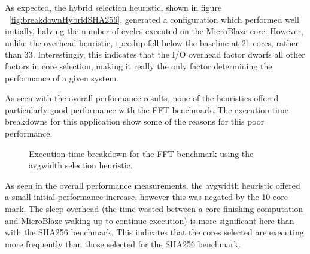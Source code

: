 \documentclass{UoYCSproject}
\begin{document}
As expected, the hybrid selection heuristic, shown in figure ~\ref{fig:breakdownHybridSHA256}, generated
a configuration which performed well initially, halving the number of cycles executed on the MicroBlaze core.
However, unlike the overhead heuristic, speedup fell below the baseline at 21 cores, rather than 33.
Interestingly, this indicates that the I/O overhead factor dwarfs all other factors in core selection, making
it really the only factor determining the performance of a given system.

As seen with the overall performance results, none of the heuristics offered particularly good performance
with the FFT benchmark. The execution-time breakdowns for this application show some of the reasons for this poor performance.

\begin{figure}[H]
\caption{Execution-time breakdown for the FFT benchmark using the avgwidth selection heuristic.}
\label{fig:breakdownAvgWidthFFT}
\end{figure}

As seen in the overall performance measurements, the avgwidth heuristic offered a small initial performance increase,
however this was negated by the 10-core mark. The sleep overhead (the time wasted between a core finishing computation
and MicroBlaze waking up to continue execution) is more significant here than with the SHA256 benchmark. This indicates that
the cores selected are executing more frequently than those selected for the SHA256 benchmark.
\end{document}
